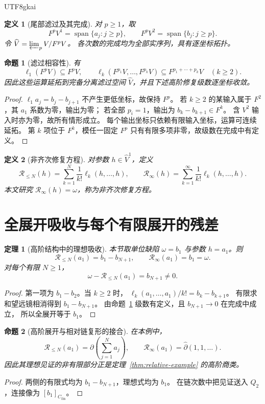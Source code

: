 \documentclass[12pt,a4paper,openany]{report}
\newtheorem{definition}{定义}[chapter]
\newtheorem{theorem}{定理}[chapter]
\newtheorem{proposition}{命题}[chapter]
\numberwithin{equation}{chapter}
\newcommand{\cfin}{C_{\mathrm{fin}}}
\newcommand{\spanof}{\operatorname{span}}
\begin{document}
\begin{CJK*}{UTF8}{gkai}
\begin{definition}[尾部滤过及其完成]
对 $p\ge1$，取
\[
 F^pV^1=\spanof\{a_j:j\ge p\},\qquad
 F^pV^2=\spanof\{b_j:j\ge p\}.
\]
令 $\widehat V=\varprojlim_p V/F^pV$。
各次数的完成均为全部实序列，具有逐坐标拓扑。
\end{definition}

\begin{proposition}[滤过相容性]
\label{prop:filtration}
有
\[
 \ell_1(F^pV)\subseteq F^pV,\qquad
 \ell_k(F^{p_1}V,\ldots,F^{p_k}V)
 \subseteq F^{p_1+\cdots+p_k}V\quad(k\ge2).
\]
因此这些运算延拓到完备分离滤过空间 $\widehat V$，并且下述高阶修复级数逐坐标收敛。
\end{proposition}
\begin{proof}
$\ell_1a_j=b_j-b_{j+1}$ 不产生更低坐标，故保持 $F^p$。
若 $k\ge2$ 的某输入属于 $F^2$，其 $a_1$ 系数为零，输出为零；
若全部 $p_i=1$，输出为 $b_k-b_{k+1}\in F^k$。
含 $V^2$ 输入时亦为零，故所有情形成立。
每个输出坐标只依赖有限输入坐标，运算可连续延拓。
第 $k$ 项位于 $F^k$，模任一固定 $F^p$ 只有有限多项非零，故级数在完成中有定义。
\end{proof}

\begin{definition}[非齐次修复方程]
对参数 $h\in\widehat V^1$，定义
\[
 \mathcal R_{\le N}(h)=
 \sum_{k=1}^N\frac1{k!}\ell_k(h,\ldots,h),\qquad
 \mathcal R_\infty(h)=
 \sum_{k=1}^\infty\frac1{k!}\ell_k(h,\ldots,h).
\]
本文研究 $\mathcal R_\infty(h)=\omega$，称为非齐次修复方程。
\end{definition}

\section{全展开吸收与每个有限展开的残差}

\begin{theorem}[高阶结构中的理想吸收]
\label{thm:linfty-absorption}
本节取单位缺陷 $\omega=b_1$ 与参数 $h=a_1$。则
\[
 \mathcal R_{\le N}(a_1)=b_1-b_{N+1},
 \qquad
 \boxed{\mathcal R_\infty(a_1)=b_1=\omega}.
\]
对每个有限 $N\ge1$，
\[
 \omega-\mathcal R_{\le N}(a_1)=b_{N+1}\ne0.
\]
\end{theorem}
\begin{proof}
第一项为 $b_1-b_2$。当 $k\ge2$ 时，
$\ell_k(a_1,\ldots,a_1)/k!=b_k-b_{k+1}$。
有限求和望远镜相消得到 $b_1-b_{N+1}$。
由命题~\ref{prop:filtration} 级数有定义，且 $b_{N+1}\to0$ 在完成中成立，
所以全展开等于 $b_1$。
\end{proof}

\begin{proposition}[高阶展开与相对链复形的接合]
在本例中，
\[
 \mathcal R_{\le N}(a_1)
 =\partial\left(\sum_{j=1}^Na_j\right),\qquad
 \mathcal R_\infty(a_1)=\widehat\partial(1,1,\ldots).
\]
因此其理想见证的非有限部分正是定理~\ref{thm:relative-example} 的高阶商类。
\end{proposition}
\begin{proof}
两侧的有限式均为 $b_1-b_{N+1}$，理想式均为 $b_1$。
在链次数中把见证送入 $Q_2$，连接像为 $[b_1]_{\cfin}$。
\end{proof}


\end{CJK*}
\end{document}
